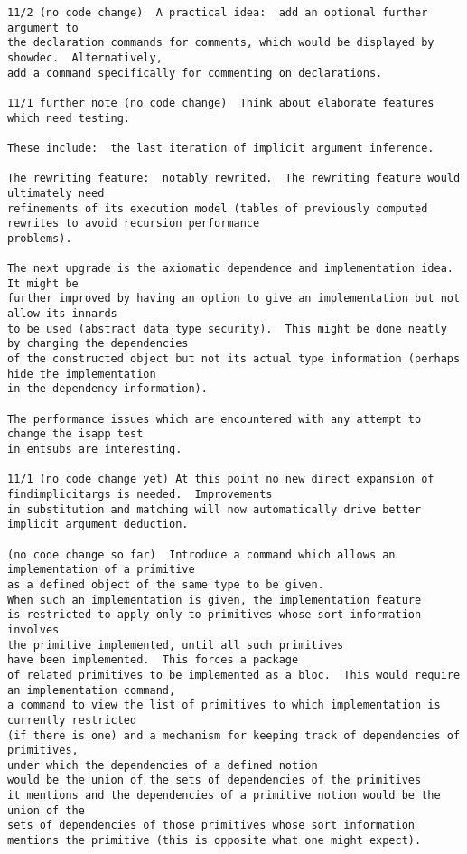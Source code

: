 \documentclass{article}
\begin{document}
{\begin{verbatim}
11/2 (no code change)  A practical idea:  add an optional further argument to
the declaration commands for comments, which would be displayed by showdec.  Alternatively,
add a command specifically for commenting on declarations.

11/1 further note (no code change)  Think about elaborate features which need testing.

These include:  the last iteration of implicit argument inference.

The rewriting feature:  notably rewrited.  The rewriting feature would ultimately need
refinements of its execution model (tables of previously computed rewrites to avoid recursion performance
problems).

The next upgrade is the axiomatic dependence and implementation idea.  It might be
further improved by having an option to give an implementation but not allow its innards
to be used (abstract data type security).  This might be done neatly by changing the dependencies
of the constructed object but not its actual type information (perhaps hide the implementation
in the dependency information).

The performance issues which are encountered with any attempt to change the isapp test
in entsubs are interesting.

11/1 (no code change yet) At this point no new direct expansion of findimplicitargs is needed.  Improvements
in substitution and matching will now automatically drive better implicit argument deduction.

(no code change so far)  Introduce a command which allows an implementation of a primitive
as a defined object of the same type to be given.  
When such an implementation is given, the implementation feature 
is restricted to apply only to primitives whose sort information involves
the primitive implemented, until all such primitives 
have been implemented.  This forces a package
of related primitives to be implemented as a bloc.  This would require an implementation command,
a command to view the list of primitives to which implementation is currently restricted 
(if there is one) and a mechanism for keeping track of dependencies of primitives, 
under which the dependencies of a defined notion 
would be the union of the sets of dependencies of the primitives
it mentions and the dependencies of a primitive notion would be the union of the 
sets of dependencies of those primitives whose sort information 
mentions the primitive (this is opposite what one might expect).


\end{verbatim}}
\end{document}
